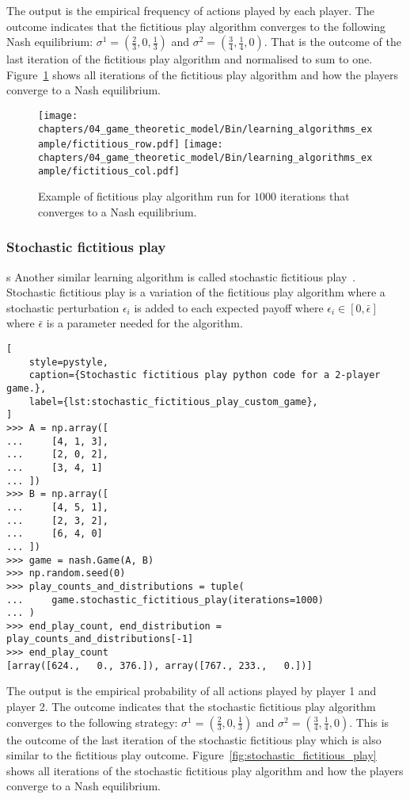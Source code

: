 The output is the empirical frequency of actions played by each player.
The outcome indicates that the fictitious play algorithm converges to the
following Nash equilibrium: \(\sigma^1 = (\frac{2}{3}, 0, \frac{1}{3})\) and
\(\sigma^2 = (\frac{3}{4}, \frac{1}{4}, 0)\).
That is the outcome of the last iteration of the fictitious play algorithm and
normalised to sum to one.
Figure~\ref{fig:fictitious_play} shows all iterations of the fictitious play
algorithm and how the players converge to a Nash equilibrium.

\begin{figure}[H]
    \centering
    \texttt{[image: chapters/04\_game\_theoretic\_model/Bin/learning\_algorithms\_example/fictitious\_row.pdf]}
    \texttt{[image: chapters/04\_game\_theoretic\_model/Bin/learning\_algorithms\_example/fictitious\_col.pdf]}
    \caption{Example of fictitious play algorithm run for \(1000\) iterations
    that converges to a Nash equilibrium.}
    \label{fig:fictitious_play}
\end{figure}


\subsubsection{Stochastic fictitious play}s
Another similar learning algorithm is called stochastic fictitious
play~\cite{hofbauerstochasticfictitous, fudenberg1998theory}.
Stochastic fictitious play is a variation of the fictitious play algorithm
where a stochastic perturbation \(\epsilon_i\) is added to each expected payoff
where \(\epsilon_i \in [0, \bar{\epsilon}]\) where \(\bar{\epsilon}\) is a
parameter needed for the algorithm.


\begin{lstlisting}[
    style=pystyle,
    caption={Stochastic fictitious play python code for a 2-player game.},
    label={lst:stochastic_fictitious_play_custom_game},
]
>>> A = np.array([
...     [4, 1, 3],
...     [2, 0, 2],
...     [3, 4, 1]
... ])
>>> B = np.array([
...     [4, 5, 1],
...     [2, 3, 2],
...     [6, 4, 0]
... ])
>>> game = nash.Game(A, B)
>>> np.random.seed(0)
>>> play_counts_and_distributions = tuple(
...     game.stochastic_fictitious_play(iterations=1000)
... )
>>> end_play_count, end_distribution = play_counts_and_distributions[-1]
>>> end_play_count
[array([624.,   0., 376.]), array([767., 233.,   0.])]

\end{lstlisting}

The output is the empirical probability of all actions played by player 1 and
player 2.
The outcome indicates that the stochastic fictitious play algorithm converges
to the following strategy: \(\sigma^1 = (\frac{2}{3}, 0, \frac{1}{3})\) and
\(\sigma^2 = (\frac{3}{4}, \frac{1}{4}, 0)\).
This is the outcome of the last iteration of the stochastic fictitious play
which is also similar to the fictitious play outcome.
Figure~\ref{fig:stochastic_fictitious_play} shows all iterations of the
stochastic fictitious play algorithm and how the players converge to a Nash
equilibrium.


